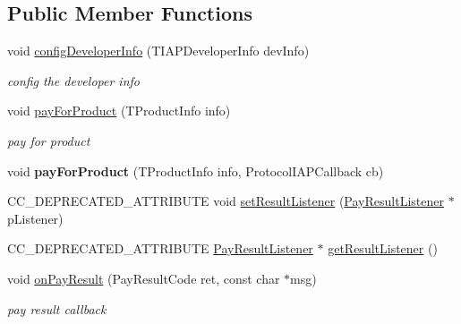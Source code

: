 \subsection*{Public Member Functions}
\begin{DoxyCompactItemize}
\item 
void \hyperlink{classcocos2d_1_1plugin_1_1ProtocolIAP_a0432aee3e56133c07dc99c33d9ae362b}{config\+Developer\+Info} (T\+I\+A\+P\+Developer\+Info dev\+Info)
\begin{DoxyCompactList}\small\item\em config the developer info \end{DoxyCompactList}\item 
void \hyperlink{classcocos2d_1_1plugin_1_1ProtocolIAP_aee946689b5ec6c570366e29c2c52939f}{pay\+For\+Product} (T\+Product\+Info info)
\begin{DoxyCompactList}\small\item\em pay for product \end{DoxyCompactList}\item 
\mbox{\label{classcocos2d_1_1plugin_1_1ProtocolIAP_a24fe572ceabf2f60917a39e5afd404d5}} 
void {\bfseries pay\+For\+Product} (T\+Product\+Info info, Protocol\+I\+A\+P\+Callback cb)
\item 
C\+C\+\_\+\+D\+E\+P\+R\+E\+C\+A\+T\+E\+D\+\_\+\+A\+T\+T\+R\+I\+B\+U\+TE void \hyperlink{classcocos2d_1_1plugin_1_1ProtocolIAP_a1007416d75f6215930e54626be8a64ea}{set\+Result\+Listener} (\hyperlink{classcocos2d_1_1plugin_1_1PayResultListener}{Pay\+Result\+Listener} $\ast$p\+Listener)
\item 
C\+C\+\_\+\+D\+E\+P\+R\+E\+C\+A\+T\+E\+D\+\_\+\+A\+T\+T\+R\+I\+B\+U\+TE \hyperlink{classcocos2d_1_1plugin_1_1PayResultListener}{Pay\+Result\+Listener} $\ast$ \hyperlink{classcocos2d_1_1plugin_1_1ProtocolIAP_ab6984d5cfdbe3b7f5c1a0797ee8e086b}{get\+Result\+Listener} ()
\item 
\mbox{\label{classcocos2d_1_1plugin_1_1ProtocolIAP_a373c4e2b3c7890e444ed812e02f7141e}} 
void \hyperlink{classcocos2d_1_1plugin_1_1ProtocolIAP_a373c4e2b3c7890e444ed812e02f7141e}{on\+Pay\+Result} (Pay\+Result\+Code ret, const char $\ast$msg)
\begin{DoxyCompactList}\small\item\em pay result callback \end{DoxyCompactList}\item 

\end{DoxyCompactItemize}
